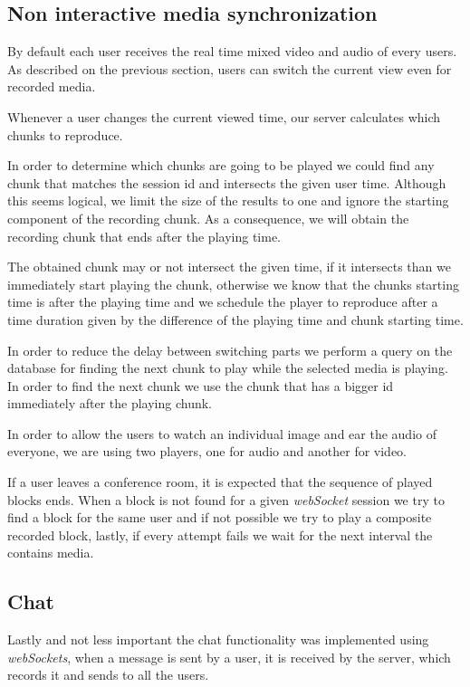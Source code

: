 \subsection{Non interactive media synchronization}
		By default each user receives the real time mixed video and audio of every users. As described on the previous section, users can switch the current view even for recorded media.

		Whenever a user changes the current viewed time, our server calculates which chunks to reproduce.

		In order to determine which chunks are going to be played we could find any chunk that matches the session id and intersects the given user time. Although this seems logical, we limit the size of the results to one and ignore the starting component of the recording chunk. As a consequence, we will obtain the recording chunk that ends after the playing time.

		The obtained chunk may or not intersect the given time, if it intersects than we immediately start playing the chunk, otherwise we know that the chunks starting time is after the playing time and we schedule the player to reproduce after a time duration given by the difference of the playing time and chunk starting time.

		In order to reduce the delay between switching parts we perform a query on the database for finding the next chunk to play while the selected media is playing. In order to find the next chunk we use the chunk that has a bigger id immediately after the playing chunk.

		In order to allow the users to watch an individual image and ear the audio of everyone, we are using two players, one for audio and another for video. 

		If a user leaves a conference room, it is expected that the sequence of played blocks ends. When a block is not found for a given \emph{webSocket} session we try to find a block for the same user and if not possible we try to play a composite recorded block, lastly, if every attempt fails we wait for the next interval the contains media.

\subsection{Chat}
		Lastly and not less important the chat functionality was implemented using \emph{webSockets}, when a message is sent by a user, it is received by the server, which records it and sends to all the users.

